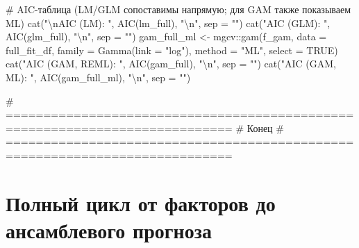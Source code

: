 \documentclass[
  letterpaper,
  DIV=11,
  numbers=noendperiod]{scrreprt}
\newenvironment{Shaded}{\begin{snugshade}}{\end{snugshade}}
\newcommand{\AttributeTok}[1]{\textcolor[rgb]{0.40,0.45,0.13}{#1}}
\newcommand{\CommentTok}[1]{\textcolor[rgb]{0.37,0.37,0.37}{#1}}
\newcommand{\ConstantTok}[1]{\textcolor[rgb]{0.56,0.35,0.01}{#1}}
\newcommand{\FunctionTok}[1]{\textcolor[rgb]{0.28,0.35,0.67}{#1}}
\newcommand{\NormalTok}[1]{\textcolor[rgb]{0.00,0.23,0.31}{#1}}
\newcommand{\OtherTok}[1]{\textcolor[rgb]{0.00,0.23,0.31}{#1}}
\newcommand{\SpecialCharTok}[1]{\textcolor[rgb]{0.37,0.37,0.37}{#1}}
\newcommand{\StringTok}[1]{\textcolor[rgb]{0.13,0.47,0.30}{#1}}
\begin{document}
\begin{Shaded}
\begin{Highlighting}[]
\CommentTok{\# AIC{-}таблица (LM/GLM сопоставимы напрямую; для GAM также показываем ML)}
\FunctionTok{cat}\NormalTok{(}\StringTok{"}\SpecialCharTok{\textbackslash{}n}\StringTok{AIC (LM): "}\NormalTok{,  }\FunctionTok{AIC}\NormalTok{(lm\_full),  }\StringTok{"}\SpecialCharTok{\textbackslash{}n}\StringTok{"}\NormalTok{, }\AttributeTok{sep =} \StringTok{""}\NormalTok{)}
\FunctionTok{cat}\NormalTok{(}\StringTok{"AIC (GLM): "}\NormalTok{, }\FunctionTok{AIC}\NormalTok{(glm\_full), }\StringTok{"}\SpecialCharTok{\textbackslash{}n}\StringTok{"}\NormalTok{, }\AttributeTok{sep =} \StringTok{""}\NormalTok{)}
\NormalTok{gam\_full\_ml }\OtherTok{\textless{}{-}}\NormalTok{ mgcv}\SpecialCharTok{::}\FunctionTok{gam}\NormalTok{(f\_gam, }\AttributeTok{data =}\NormalTok{ full\_fit\_df, }\AttributeTok{family =} \FunctionTok{Gamma}\NormalTok{(}\AttributeTok{link =} \StringTok{"log"}\NormalTok{), }\AttributeTok{method =} \StringTok{"ML"}\NormalTok{, }\AttributeTok{select =} \ConstantTok{TRUE}\NormalTok{)}
\FunctionTok{cat}\NormalTok{(}\StringTok{"AIC (GAM, REML): "}\NormalTok{, }\FunctionTok{AIC}\NormalTok{(gam\_full),    }\StringTok{"}\SpecialCharTok{\textbackslash{}n}\StringTok{"}\NormalTok{, }\AttributeTok{sep =} \StringTok{""}\NormalTok{)}
\FunctionTok{cat}\NormalTok{(}\StringTok{"AIC (GAM, ML):   "}\NormalTok{, }\FunctionTok{AIC}\NormalTok{(gam\_full\_ml), }\StringTok{"}\SpecialCharTok{\textbackslash{}n}\StringTok{"}\NormalTok{, }\AttributeTok{sep =} \StringTok{""}\NormalTok{)}


\CommentTok{\# ============================================================================}
\CommentTok{\# Конец}
\CommentTok{\# ============================================================================}
\end{Highlighting}
\end{Shaded}

\section{Полный цикл от факторов до ансамблевого
прогноза}\label{ux43fux43eux43bux43dux44bux439-ux446ux438ux43aux43b-ux43eux442-ux444ux430ux43aux442ux43eux440ux43eux432-ux434ux43e-ux430ux43dux441ux430ux43cux431ux43bux435ux432ux43eux433ux43e-ux43fux440ux43eux433ux43dux43eux437ux430}
\end{document}
